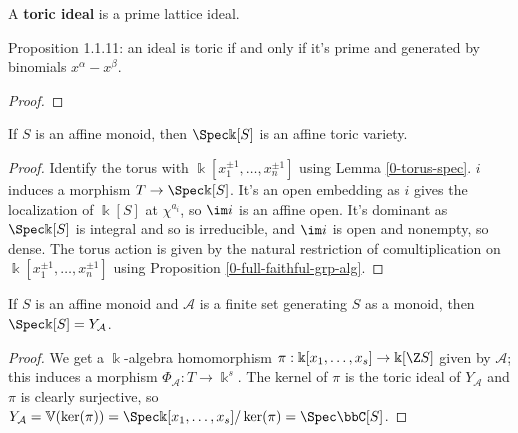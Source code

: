 \begin{definition}
  \label{1-1-10-toric-ideal}
  \leanok
  A {\bf toric ideal} is a prime lattice ideal.
\end{definition}


\begin{proposition}
  \label{1-1-11-toric-ideal-gen-binomial}

  Proposition 1.1.11: an ideal is toric if and only if it's prime and generated by binomials $x^\alpha - x^\beta$.
\end{proposition}
\begin{proof}

\end{proof}


\begin{proposition}
  \label{1-1-14-aff-tor-var-spec-aff-mon-alg}
  \leanok

  If $S$ is an affine monoid, then $\Spec \Bbbk[S]$ is an affine toric variety.
\end{proposition}
\begin{proof}

  Identify the torus with $\Bbbk[x_1^{\pm1}, \dotsc, x_n^{\pm1}]$ using Lemma \ref{0-torus-spec}.
  $i$ induces a morphism $T \to \Spec \Bbbk[S]$. It's an open embedding as $i$ gives the localization of $\Bbbk[S]$ at $\chi^{a_i}$, so $\im i$ is an affine open. It's dominant as $\Spec \Bbbk[S]$ is integral and so is irreducible, and $\im i$ is open and nonempty, so dense. The torus action is given by the natural restriction of comultiplication on $\Bbbk[x_1^{\pm1}, \dotsc, x_n^{\pm1}]$ using Proposition \ref{0-full-faithful-grp-alg}.
\end{proof}


\begin{proposition}
  \label{1-1-14-spec-aff-mon-alg-eq-ya}

  If $S$ is an affine monoid and $\mathcal A$ is a finite set generating $S$ as a monoid, then $\Spec \Bbbk[S] = Y_{\mathcal A}$.
\end{proposition}
\begin{proof}

  We get a $\Bbbk$-algebra homomorphism $\pi : \Bbbk[x_1, \dotsc, x_s] \to \Bbbk[\Z S]$ given by $\mathcal A$; this induces a morphism $\Phi_{\mathcal A} : T \to \Bbbk^s$. The kernel of $\pi$ is the toric ideal of $Y_{\mathcal A}$ and $\pi$ is clearly surjective, so $Y_{\mathcal A} = \mathbb V(\ker(\pi)) = \Spec \Bbbk[x_1, \dotsc, x_s] / \ker(\pi) = \Spec \bbC[S]$.
\end{proof}


